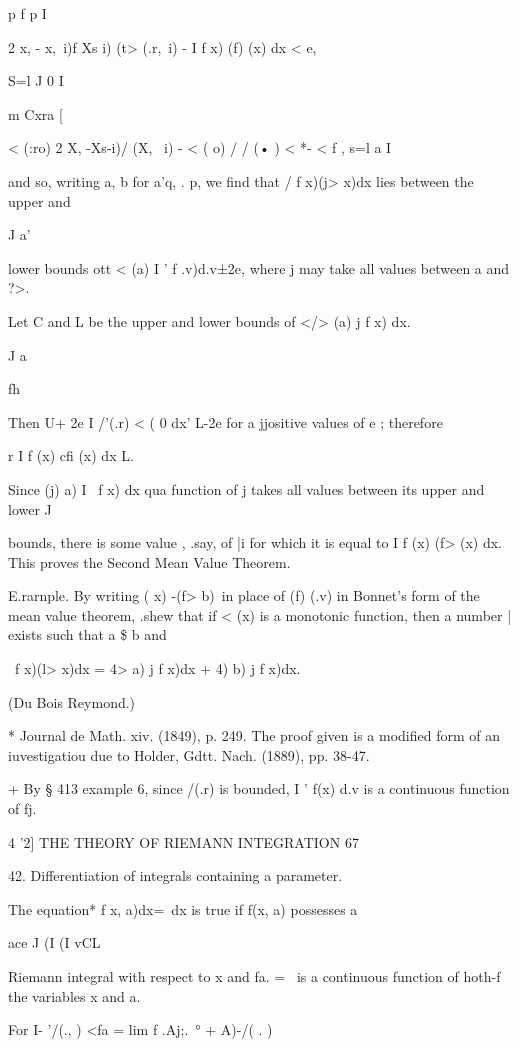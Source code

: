 p f p I

2 x, - x,\ i)f Xs i) (t> (.r,\ i) - I f x) (f) (x) dx < e,

S=l J 0 I

m Cxra [

< (:ro) 2 X, -Xs-i)/ (X, \ i) - < ( o) / / (• ) < *- < f , s=l a I

and so, writing a, b for a'q, . p, we find that / f x)(j> x)dx lies
between the upper and

J a'

lower bounds ott < (a) I ' f .v)d.v±2e, where j may take all values
between a and ?>.

Let C and L be the upper and lower bounds of </> (a) j f x) dx.

J a

fh

Then U+ 2e I /'(.r) < ( 0 dx' L-2e for a jjositive values of e ;
therefore

r I f (x) cfi (x) dx L.

Since (j) a) I \ f x) dx qua function of j takes all values between
its upper and lower J

bounds, there is some value , .say, of |i for which it is equal to I f
(x) (f> (x) dx. This proves the Second Mean Value Theorem.

E.rarnple. By writing ( x) -(f> b)\ in place of (f) (.v) in Bonnet's
form of the mean value theorem, .shew that if < (x) is a monotonic
function, then a number | exists such that a \$ b and

\ f x)(l> x)dx = 4> a) j f x)dx + 4) b) j f x)dx.

(Du Bois Reymond.)

* Journal de Math. xiv. (1849), p. 249. The proof given is a modified
form of an iuvestigatiou due to Holder, Gdtt. Nach. (1889), pp. 38-47.

+ By § 413 example 6, since /(.r) is bounded, I ' f(x) d.v is a
continuous function of fj.



4 '2] THE THEORY OF RIEMANN INTEGRATION 67

42. Differentiation of integrals containing a parameter.

The equation* f x, a)dx=\ dx is true if f(x, a) possesses a

ace J (I (I vCL

Riemann integral with respect to x and fa. = \ is a continuous
function of hoth-f the variables x and a.

For I- '/(., ) <fa = lim f .Aj;.\ ° + A)-/( . )


